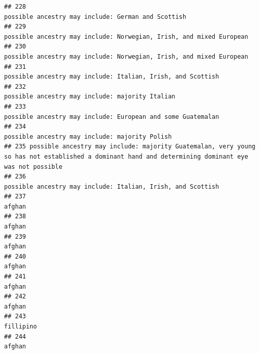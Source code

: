 \documentclass[]{article}
\begin{document}
\begin{verbatim}
## 228                                                                                                  possible ancestry may include: German and Scottish
## 229                                                                                 possible ancestry may include: Norwegian, Irish, and mixed European
## 230                                                                                 possible ancestry may include: Norwegian, Irish, and mixed European
## 231                                                                                         possible ancestry may include: Italian, Irish, and Scottish
## 232                                                                                                     possible ancestry may include: majority Italian
## 233                                                                                         possible ancestry may include: European and some Guatemalan
## 234                                                                                                      possible ancestry may include: majority Polish
## 235 possible ancestry may include: majority Guatemalan, very young so has not established a dominant hand and determining dominant eye was not possible
## 236                                                                                         possible ancestry may include: Italian, Irish, and Scottish
## 237                                                                                                                                              afghan
## 238                                                                                                                                              afghan
## 239                                                                                                                                              afghan
## 240                                                                                                                                              afghan
## 241                                                                                                                                              afghan
## 242                                                                                                                                              afghan
## 243                                                                                                                                           fillipino
## 244                                                                                                                                              afghan

\end{verbatim}
\end{document}
